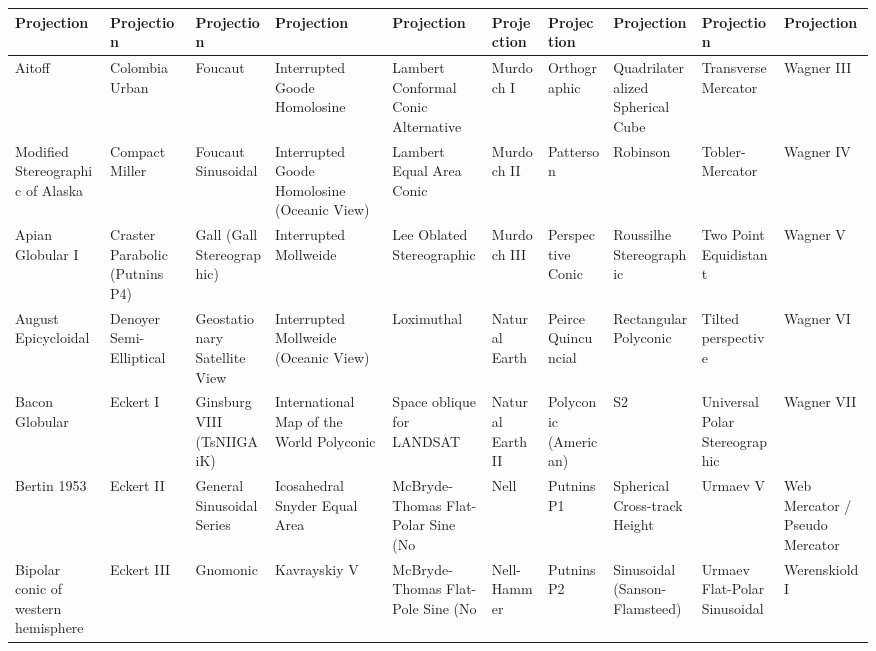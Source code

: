 \documentclass[11pt,dvipsnames,ignorenonframetext,aspectratio=169]{beamer}
\begin{document}
\begin{frame}{}
\protect\hypertarget{section-2}{}
\setlength{\tabcolsep}{2pt}

\begin{table}
\centering\begingroup\fontsize{4}{6}\selectfont

\begin{tabular}{>{\raggedright\arraybackslash}p{8em}>{\raggedright\arraybackslash}p{8em}>{\raggedright\arraybackslash}p{8em}>{\raggedright\arraybackslash}p{8em}>{\raggedright\arraybackslash}p{8em}>{\raggedright\arraybackslash}p{8em}>{\raggedright\arraybackslash}p{8em}>{\raggedright\arraybackslash}p{8em}>{\raggedright\arraybackslash}p{8em}>{\raggedright\arraybackslash}p{8em}}
\toprule
Projection & Projection & Projection & Projection & Projection & Projection & Projection & Projection & Projection & Projection\\
\midrule
Aitoff & Colombia Urban & Foucaut & Interrupted Goode Homolosine & Lambert Conformal Conic Alternative & Murdoch I & Orthographic & Quadrilateralized Spherical Cube & Transverse Mercator & Wagner III\\
Modified Stereographic of Alaska & Compact Miller & Foucaut Sinusoidal & Interrupted Goode Homolosine (Oceanic View) & Lambert Equal Area Conic & Murdoch II & Patterson & Robinson & Tobler-Mercator & Wagner IV\\
Apian Globular I & Craster Parabolic (Putnins P4) & Gall (Gall Stereographic) & Interrupted Mollweide & Lee Oblated Stereographic & Murdoch III & Perspective Conic & Roussilhe Stereographic & Two Point Equidistant & Wagner V\\
August Epicycloidal & Denoyer Semi-Elliptical & Geostationary Satellite View & Interrupted Mollweide (Oceanic View) & Loximuthal & Natural Earth & Peirce Quincuncial & Rectangular Polyconic & Tilted perspective & Wagner VI\\
Bacon Globular & Eckert I & Ginsburg VIII (TsNIIGAiK) & International Map of the World Polyconic & Space oblique for LANDSAT & Natural Earth II & Polyconic (American) & S2 & Universal Polar Stereographic & Wagner VII\\
\addlinespace
Bertin 1953 & Eckert II & General Sinusoidal Series & Icosahedral Snyder Equal Area & McBryde-Thomas Flat-Polar Sine (No & Nell & Putnins P1 & Spherical Cross-track Height & Urmaev V & Web Mercator / Pseudo Mercator\\
Bipolar conic of western hemisphere & Eckert III & Gnomonic & Kavrayskiy V & McBryde-Thomas Flat-Pole Sine (No & Nell-Hammer & Putnins P2 & Sinusoidal (Sanson-Flamsteed) & Urmaev Flat-Polar Sinusoidal & Werenskiold I\\

\end{tabular}
\end{table}
\end{frame}
\end{document}
